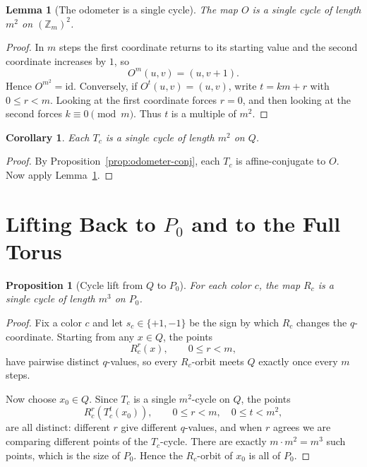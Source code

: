 \documentclass[11pt]{article}
\newtheorem{proposition}[theorem]{Proposition}
\newtheorem{lemma}[theorem]{Lemma}
\newtheorem{corollary}[theorem]{Corollary}
\newcommand{\Zm}{\mathbb Z_m}
\newcommand{\Pzero}{P_0}
\newcommand{\Qslice}{Q}
\begin{document}
\begin{lemma}[The odometer is a single cycle]\label{lem:odometer}
The map $O$ is a single cycle of length $m^2$ on $(\Zm)^2$.
\end{lemma}

\begin{proof}
In $m$ steps the first coordinate returns to its starting value and the second
coordinate increases by $1$, so
\[
O^m(u,v)=(u,v+1).
\]
Hence $O^{m^2}=\mathrm{id}$. Conversely, if $O^t(u,v)=(u,v)$, write $t=km+r$ with
$0 \le r < m$. Looking at the first coordinate forces $r=0$, and then looking at
the second forces $k \equiv 0 \pmod m$. Thus $t$ is a multiple of $m^2$.
\end{proof}

\begin{corollary}\label{cor:T-cycle}
Each $T_c$ is a single cycle of length $m^2$ on $\Qslice$.
\end{corollary}

\begin{proof}
By Proposition~\ref{prop:odometer-conj}, each $T_c$ is affine-conjugate to $O$.
Now apply Lemma~\ref{lem:odometer}.
\end{proof}

\section{Lifting Back to \texorpdfstring{$\Pzero$}{P0} and to the Full Torus}\label{sec:lifts}

\begin{proposition}[Cycle lift from $\Qslice$ to $\Pzero$]\label{prop:lift-p0}
For each color $c$, the map $R_c$ is a single cycle of length $m^3$ on $\Pzero$.
\end{proposition}

\begin{proof}
Fix a color $c$ and let $s_c \in \{+1,-1\}$ be the sign by which $R_c$ changes
the $q$-coordinate. Starting from any $x \in \Qslice$, the points
\[
R_c^r(x), \qquad 0 \le r < m,
\]
have pairwise distinct $q$-values, so every $R_c$-orbit meets $\Qslice$ exactly
once every $m$ steps.

Now choose $x_0 \in \Qslice$. Since $T_c$ is a single $m^2$-cycle on $\Qslice$,
the points
\[
R_c^r(T_c^t(x_0)),
\qquad
0 \le r < m,\quad 0 \le t < m^2,
\]
are all distinct: different $r$ give different $q$-values, and when $r$ agrees we
are comparing different points of the $T_c$-cycle. There are exactly
$m \cdot m^2 = m^3$ such points, which is the size of $\Pzero$. Hence the
$R_c$-orbit of $x_0$ is all of $\Pzero$.
\end{proof}
\end{document}
